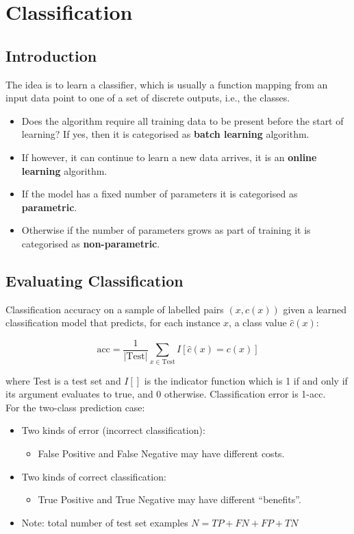 \section{Classification}

\subsection{Introduction}

The idea is to learn a classifier, which is usually a function mapping from an input data point to one of a set of discrete outputs, i.e., the classes.

\begin{itemize}
    \item Does the algorithm require all training data to be present before the start of learning? If yes, then it is categorised as \textbf{batch learning} algorithm.
    \item If however, it can continue to learn a new data arrives, it is an \textbf{online learning} algorithm.
    \item If the model has a fixed number of parameters it is categorised as \textbf{parametric}.
    \item Otherwise if the number of parameters grows as part of training it is categorised as \textbf{non-parametric}.
\end{itemize}

\subsection{Evaluating Classification}

Classification accuracy on a sample of labelled pairs \((x, c(x))\) given a learned classification model that predicts, for each instance \(x\), a class value \(\hat{c}(x)\):

\[\mathrm{acc} = \frac{1}{|\mathrm{Test}|} \sum_{x \in \mathrm{Test}} I[\hat{c}(x) = c(x)]\]

where Test is a test set and \(I[]\) is the indicator function which is 1 if and only if its argument evaluates to true, and 0 otherwise. Classification error is 1-acc. \\

For the two-class prediction case:

\begin{itemize}
    \item Two kinds of error (incorrect classification):
    \begin{itemize}
        \item False Positive and False Negative may have different costs.
    \end{itemize}
    \item Two kinds of correct classification:
    \begin{itemize}
        \item True Positive and True Negative may have different ``benefits''.
    \end{itemize}
    \item Note: total number of test set examples \(N = TP + FN + FP + TN\)
\end{itemize}

